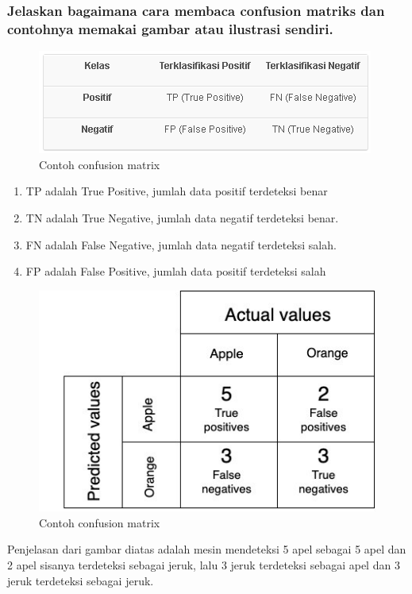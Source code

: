 \subsubsection{Jelaskan bagaimana cara membaca confusion matriks dan contohnya memakai gambar atau ilustrasi sendiri.}
\begin{figure}[H]
	\centering
	\includegraphics{figures/1174089/3/carabacaconfusionmatrix.PNG}
	\caption{Contoh confusion matrix}
\end{figure}
\begin{enumerate}
\item TP adalah True Positive, jumlah data positif terdeteksi benar 
\item TN adalah True Negative,  jumlah data negatif terdeteksi benar.
\item FN adalah False Negative,  jumlah data negatif terdeteksi salah.
\item FP adalah False Positive,  jumlah data positif terdeteksi salah 
\end{enumerate}
\begin{figure}[H]
	\centering
	\includegraphics{figures/1174089/3/contohconfusionmatrix.jpeg}
	\caption{Contoh confusion matrix}
\end{figure}
Penjelasan dari gambar diatas adalah mesin mendeteksi 5 apel sebagai 5 apel dan 2 apel sisanya terdeteksi sebagai jeruk, lalu 3 jeruk terdeteksi sebagai apel dan 3 jeruk terdeteksi sebagai jeruk.


